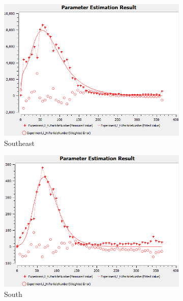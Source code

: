 \documentclass[10pt,letterpaper]{article}
\begin{document}
\begin{figure}
\begin{subfigure}[b]{0.3\textwidth}
         \centering
         \includegraphics[width=\textwidth]{Zika_PE_figs/southeast_PE_0419.png}
         \caption{Southeast}
         \label{fig:SE_PE}
     \end{subfigure}
      \hfill
     \begin{subfigure}[b]{0.3\textwidth}
         \centering
         \includegraphics[width=\textwidth]{Zika_PE_figs/south_PE_0419.png}
         \caption{South}
         \label{fig:south_PE}
     \end{subfigure}
      \hfill
     \begin{subfigure}[b]{0.3\textwidth}
         \centering

\end{subfigure}
\end{figure}
\end{document}
